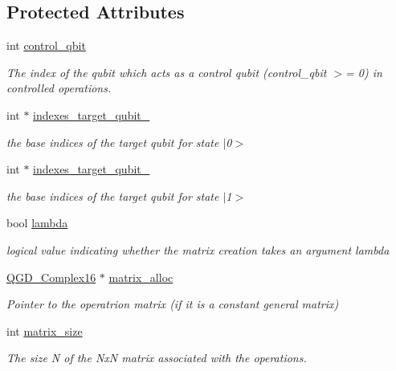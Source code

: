 \subsection*{Protected Attributes}
\begin{DoxyCompactItemize}
\item 
int \hyperlink{class_operation_a9a798ea8adec5a45fd2ca07996da88e1}{control\+\_\+qbit}
\begin{DoxyCompactList}\small\item\em The index of the qubit which acts as a control qubit (control\+\_\+qbit $>$= 0) in controlled operations. \end{DoxyCompactList}\item 
int $\ast$ \hyperlink{class_u3_af8f652178632c7aa4dbf191ed63d5090}{indexes\+\_\+target\+\_\+qubit\+\_}
\begin{DoxyCompactList}\small\item\em the base indices of the target qubit for state $\vert$0$>$ \end{DoxyCompactList}\item 
int $\ast$ \hyperlink{class_u3_a786dfe52553bb9cfeac1c66fd7b76f19}{indexes\+\_\+target\+\_\+qubit\+\_}
\begin{DoxyCompactList}\small\item\em the base indices of the target qubit for state $\vert$1$>$ \end{DoxyCompactList}\item 
bool \hyperlink{class_u3_ac7395aed7e70e30f56012effd2b21a95}{lambda}
\begin{DoxyCompactList}\small\item\em logical value indicating whether the matrix creation takes an argument lambda \end{DoxyCompactList}\item 
\hyperlink{struct_q_g_d___complex16}{Q\+G\+D\+\_\+\+Complex16} $\ast$ \hyperlink{class_operation_ade4d28d271ca13950d04363aac1c382e}{matrix\+\_\+alloc}
\begin{DoxyCompactList}\small\item\em Pointer to the operatrion matrix (if it is a constant general matrix) \end{DoxyCompactList}\item 
int \hyperlink{class_operation_a8236c07112cb165a00d3869363808624}{matrix\+\_\+size}
\begin{DoxyCompactList}\small\item\em The size N of the NxN matrix associated with the operations. \end{DoxyCompactList}\item 

\end{DoxyCompactItemize}
